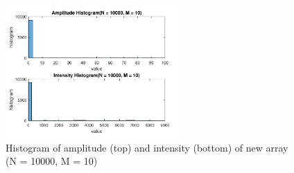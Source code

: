 \documentclass{article}
\begin{document}
\begin{figure}[H]
	\centering
	\includegraphics[width = 0.6\textwidth]{src/2pi/hist_10000_10.pdf}
	\caption{Histogram of amplitude (top) and intensity (bottom) of new array (N = 10000, M = 10)}
	\label{fig:hist-10000-10}
\end{figure}
\end{document}
